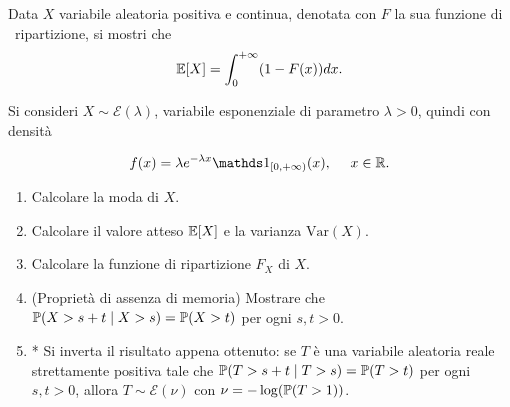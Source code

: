 Data $X$ variabile aleatoria positiva e continua, denotata con $F$ la sua funzione di \ ripartizione, si mostri che
\begin{equation*}
\mathbb{E}[X] =\int_{0}^{+\infty }(1-F(x)) dx.
\end{equation*}

Si consideri $X\sim \mathcal{E}(\lambda)$, variabile esponenziale di parametro $\lambda  >0$, quindi con densità


\begin{equation*}
f(x) =\lambda e^{-\lambda x} \Ind_{[ 0,+\infty)}(x) ,\ \ \ \ x\in \RR .
\end{equation*}
\begin{enumerate}
\item Calcolare la moda di $X$.
\item Calcolare il valore atteso $\mathbb{E}[X]$ e la varianza $\mathrm{Var}(X)$.
\item Calcolare la funzione di ripartizione $F_{X}$ di $X$.
\item (Proprietà di assenza di memoria) Mostrare che $\mathbb{P}(X >s+t \mid X >s) =\mathbb{P}(X >t)$ per ogni $s,t >0$.
\item * Si inverta il risultato appena ottenuto: se $T$ è una variabile aleatoria reale strettamente positiva tale che $\mathbb{P}(T >s+t\mid T >s) =\mathbb{P}(T >t)$ per ogni $s,t >0$, allora $T\sim \mathcal{E}(\nu)$ con $\nu =-\log(\mathbb{P}(T >1))$.
\end{enumerate}

